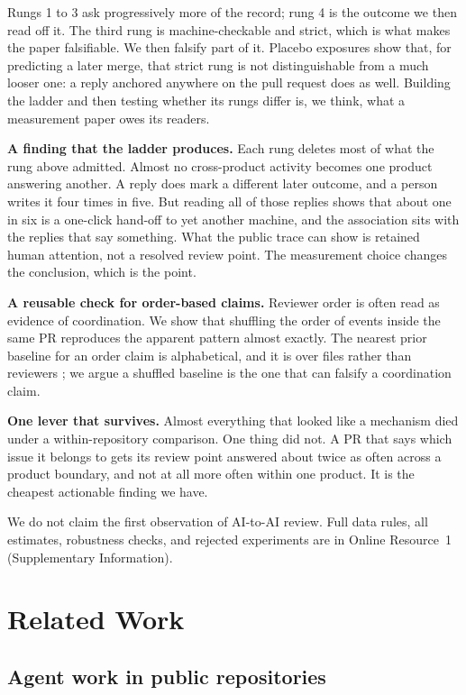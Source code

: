 \documentclass[lineno,pdflatex,sn-basic]{sn-jnl}
\begin{document}
\noindent Rungs 1 to 3 ask progressively more of the record; rung 4 is the
outcome we then read off it. The third rung is machine-checkable and strict, which is what
makes the paper falsifiable. We then falsify part of it. Placebo exposures show
that, for predicting a later merge, that strict rung is not distinguishable from a
much looser one: a reply anchored anywhere on the pull request does as well.
Building the ladder and then testing whether its rungs differ is, we think, what a
measurement paper owes its readers.

\textbf{A finding that the ladder produces.} Each rung deletes most of what the
rung above admitted. Almost no cross-product activity becomes one product
answering another. A reply does mark a different later outcome, and a person
writes it four times in five. But reading all of those replies shows that about
one in six is a one-click hand-off to yet another machine, and the association
sits with the replies that say something. What the public trace can show is retained human attention,
not a resolved review point. The measurement choice changes the conclusion, which
is the point.

\textbf{A reusable check for order-based claims.} Reviewer order is often read
as evidence of coordination. We show that shuffling the order of events inside
the same PR reproduces the apparent pattern almost exactly. The nearest prior baseline for an order claim is alphabetical, and it is over files rather than reviewers \citep{bouraffa2025orders}; we
argue a shuffled baseline is the one that can falsify a coordination claim.

\textbf{One lever that survives.} Almost everything that looked like a mechanism
died under a within-repository comparison. One thing did not. A PR that says
which issue it belongs to gets its review point answered about twice as often
across a product boundary, and not at all more often within one product. It is
the cheapest actionable finding we have.

We do not claim the first observation of AI-to-AI review. Full data rules, all
estimates, robustness checks, and rejected experiments are in Online Resource~1
(Supplementary Information).

\section{Related Work}\label{sec:related}

\subsection{Agent work in public repositories}
\end{document}
